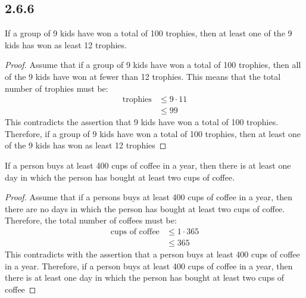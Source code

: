 \subsection*{2.6.6}
\begin{enumerate}
   If a group of 9 kids have won a total of 100 trophies, then at least one of the 9 kids has won as least 12 trophies.
  \begin{proof}
    Assume that if a group of 9 kids have won a total of 100 trophies, then all of the 9 kids have won at fewer than 12 trophies. This means that the total number of trophies must be:
    \begin{align*}
      \text{trophies} & \leq 9 \cdot 11 \\
                      & \leq 99
    \end{align*}
    This contradicts the assertion that 9 kids have won a total of 100 trophies. Therefore, if a group of 9 kids have won a total of 100 trophies, then at least one of the 9 kids has won as least 12 trophies
  \end{proof}
   If a person buys at least 400 cups of coffee in a year, then there is at least one day in which the person has bought at least two cups of coffee.
  \begin{proof}
    Assume that if a persons buys at least 400 cups of coffee in a year, then there are no days in which the person has bought at least two cups of coffee. Therefore, the total number of coffees must be:
    \begin{align*}
      \text{cups of coffee} & \leq 1 \cdot 365 \\
                            & \leq 365
    \end{align*}
    This contradicts with the assertion that a person buys at least 400 cups of coffee in a year. Therefore, if a person buys at least 400 cups of coffee in a year, then there is at least one day in which the person has bought at least two cups of coffee
  \end{proof}
\end{enumerate}

